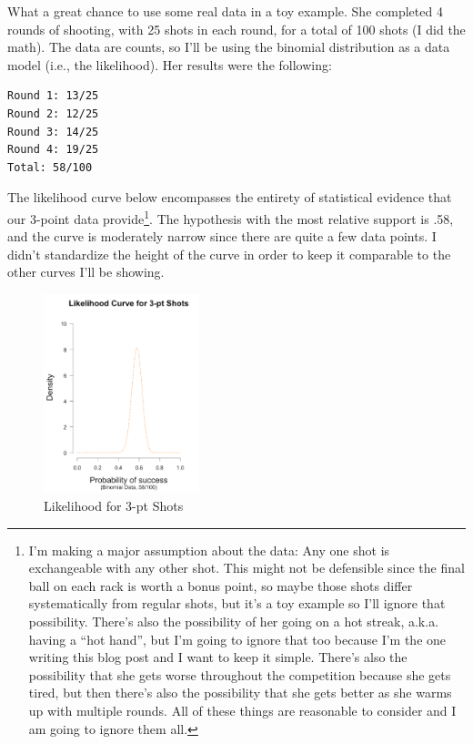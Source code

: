What a great chance to use some real data in a toy example. She completed 4 rounds of shooting, with 25 shots in each round, for a total of 100 shots (I did the math). The data are counts, so I'll be using the binomial distribution as a data model (i.e., the likelihood). Her results were the following:
\begin{lstlisting}
Round 1: 13/25               
Round 2: 12/25               
Round 3: 14/25               
Round 4: 19/25
Total: 58/100
\end{lstlisting}
The likelihood curve below encompasses the entirety of statistical evidence that our 3-point data provide\footnote{I'm making a major assumption about the data: Any one shot is exchangeable with any other shot. This might not be defensible since the final ball on each rack is worth a bonus point, so maybe those shots differ systematically from regular shots, but it's a toy example so I'll ignore that possibility. There's also the possibility of her going on a hot streak, a.k.a. having a ``hot hand'', but I'm going to ignore that too because I'm the one writing this blog post and I want to keep it simple. There's also the possibility that she gets worse throughout the competition because she gets tired, but then there's also the possibility that she gets better as she warms up with multiple rounds. All of these things are reasonable to consider and I am going to ignore them all.}. The hypothesis with the most relative support is .58, and the curve is moderately narrow since there are quite a few data points. I didn't standardize the height of the curve in order to keep it comparable to the other curves I'll be showing.


\begin{figure}[h]
\centering
\includegraphics[width=0.4\textwidth]{pic/p05c03-snip05.png}
\caption{Likelihood for 3-pt Shots}
\label{fig:p05c03-snip05}
\end{figure}

